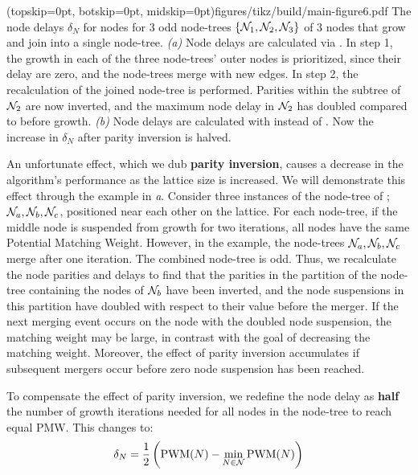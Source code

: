 \Figure[tb](topskip=0pt, botskip=0pt, midskip=0pt){figures/tikz/build/main-figure6.pdf}{
    The node delays $\delta_N$ for nodes for 3 odd node-trees $\{\mathcal{N}_1, \mathcal{N}_2, \mathcal{N}_3\}$ of 3 nodes that grow and join into a single node-tree. \emph{(a)} Node delays are calculated via . In step 1, the growth in each of the three node-trees' outer nodes is prioritized, since their delay are zero, and the node-trees merge with new edges. In step 2, the recalculation of the joined node-tree is performed. Parities within the subtree of $\mathcal{N}_2$ are now inverted, and the maximum node delay in $\mathcal{N}_2$ has doubled compared to before growth. \emph{(b)} Node delays are calculated with  instead of . Now the increase in $\delta_N$ after parity inversion is halved.\label{fig:partialdfs}}

An unfortunate effect, which we dub \textbf{parity inversion}, causes a decrease in the algorithm's performance as the lattice size is increased. We will demonstrate this effect through the example in \emph{a}. Consider three instances of the node-tree of ; $\mathcal{N}_a, \mathcal{N}_b, \mathcal{N}_c$, positioned near each other on the lattice. For each node-tree, if the middle node is suspended from growth for two iterations, all nodes have the same Potential Matching Weight. However, in the example, the node-trees $\mathcal{N}_a, \mathcal{N}_b, \mathcal{N}_c$ merge after one iteration. The combined node-tree is odd. Thus, we recalculate the node parities and delays to find that the parities in the partition of the node-tree containing the nodes of $\mathcal{N}_b$ have been inverted, and the node suspensions in this partition have doubled with respect to their value before the merger. If the next merging event occurs on the node with the doubled node suspension, the matching weight may be large, in contrast with the goal of decreasing the matching weight. Moreover, the effect of parity inversion accumulates if subsequent mergers occur before zero node suspension has been reached. %

To compensate the effect of parity inversion, we redefine the node delay as \textbf{half} the number of growth iterations needed for all nodes in the node-tree to reach equal PMW. This changes  to:
\begin{equation}\label{eq:pmwdifnew}
  \delta_N = \frac{1}{2}\left(\text{PWM}(N) - \min_{N\in\mathcal{N}}{\text{PWM}(N) }\right)
\end{equation}